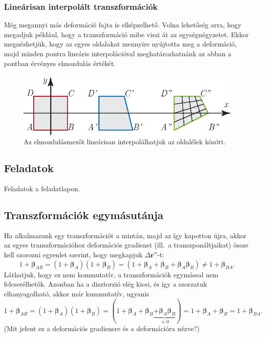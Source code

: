 \documentclass[12pt,a4paper]{scrartcl}
\let\mathbf\bm
\begin{document}
\subsubsection{Lineárisan interpolált transzformációk}
Még megannyi más deformáció fajta is elképzelhető. Volna lehetőség arra, hogy megadjuk például, hogy a transzformáció mibe viszi át az egységnégyzetet. Ekkor megnézhetjük, hogy az egyes oldalakat mennyire nyújtotta meg a deformáció, majd minden pontra lineáris interpolációval meghatározhatnánk az abban a pontban érvényes elmozdulás értékét.

\begin{figure}[htb] 
\centering    
\includegraphics[scale=1]{figs/linearisan_interpolalt.eps}
\caption{Az elmozdulásmezőt lineárisan interpolálhatjuk az oldalélek között.}
\label{fig:linearis_interpolacios_traf}
\end{figure}

\subsection{Feladatok}
Feladatok a feladatlapon.

\subsection{Transzformációk egymásutánja}
Ha alkalmazunk egy transzformációt a mintán, majd az így kapotton újra, akkor az egyes transzformációhoz deformációs gradienst (ill.\ a transzponáltjaikat) össze kell szorozni \az{\eqref{eq:disztrozio_def}} egyenlet szerint, hogy megkapjuk $\Delta {\mathbf{r}}''$-t:
\[1 + {{\mathbf{\beta }}_{AB}} = \left( {1 + {{\mathbf{\beta }}_A}} \right)\left( {1 + {{\mathbf{\beta }}_B}} \right) = \left( {1 + {{\mathbf{\beta }}_A} + {{\mathbf{\beta }}_B} + {{\mathbf{\beta }}_A}{{\mathbf{\beta }}_B}} \right) \ne 1 + {{\mathbf{\beta }}_{BA}}.\]
Láthatjuk, hogy ez nem kommutatív, a transzformációk egymással nem felcserélhetők. Azonban ha a disztorzió elég kicsi, és így a szorzatuk elhanyagolható, akkor már kummutatív, ugyanis 
\begin{equation} \label{eq:deform_kommutatív}
1 + {{\mathbf{\beta }}_{AB}} = \left( {1 + {{\mathbf{\beta }}_A}} \right)\left( {1 + {{\mathbf{\beta }}_B}} \right) = \left( {1 + {{\mathbf{\beta }}_A} + {{\mathbf{\beta }}_B}\underbrace { + {{\mathbf{\beta }}_A}{{\mathbf{\beta }}_B}}_{ \approx 0}} \right) = 1 + {{\mathbf{\beta }}_A} + {{\mathbf{\beta }}_B} = 1 + {{\mathbf{\beta }}_{BA}}.
\end{equation}
(Mit jelent ez a deformációs gradiensre és a deformációra nézve?)
\end{document}
